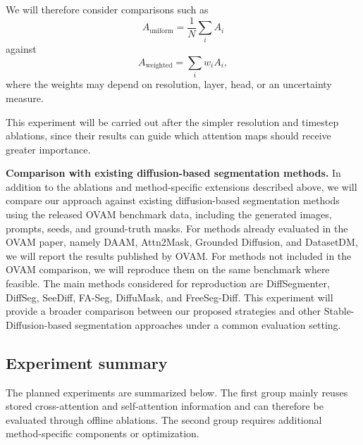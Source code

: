 \documentclass[11pt,a4paper]{article}
\begin{document}
We will therefore consider comparisons such as
\[
A_{\mathrm{uniform}}
=
\frac{1}{N}\sum_i A_i
\]
against
\[
A_{\mathrm{weighted}}
=
\sum_i w_i A_i,
\]
where the weights may depend on resolution, layer, head, or an uncertainty measure.

This experiment will be carried out after the simpler resolution and timestep
ablations, since their results can guide which attention maps should receive greater
importance.

\textbf{Comparison with existing diffusion-based segmentation methods.}
In addition to the ablations and method-specific extensions described above, we
will compare our approach against existing diffusion-based segmentation methods
using the released OVAM benchmark data, including the generated images, prompts,
seeds, and ground-truth masks. For methods already evaluated in the OVAM paper,
namely DAAM, Attn2Mask, Grounded Diffusion, and DatasetDM, we will report the
results published by OVAM. For methods not included in the OVAM comparison, we
will reproduce them on the same benchmark where feasible. The main methods
considered for reproduction are DiffSegmenter, DiffSeg, SeeDiff, FA-Seg,
DiffuMask, and FreeSeg-Diff. This experiment will provide a broader comparison
between our proposed strategies and other Stable-Diffusion-based segmentation
approaches under a common evaluation setting.

\subsection*{Experiment summary}

The planned experiments are summarized below. The first group mainly reuses stored
cross-attention and self-attention information and can therefore be evaluated through
offline ablations. The second group requires additional method-specific components or
optimization.
\end{document}
